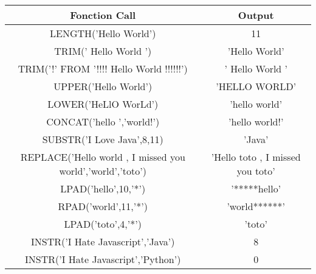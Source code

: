 \vspace{0.25cm}
\begin{center}
    
\renewcommand{\arraystretch}{1.5}
    \begin{tabular}{|c|c|}
        \hline
        Fonction Call & Output\\
        \hline
        LENGTH('Hello World') & 11 \\
        \hline
        TRIM('   Hello  World   ') & 'Hello  World'\\
        \hline
        TRIM('!' FROM '!!!! Hello  World  !!!!!!') & ' Hello  World  ' \\
        \hline
        UPPER('Hello World') &  'HELLO WORLD'\\
        \hline
        LOWER('HeLlO WorLd') & 'hello world'\\
        \hline
        CONCAT('hello ','world!') & 'hello world!'\\
        \hline
        SUBSTR('I Love Java',8,11) & 'Java'\\
        \hline
        REPLACE('Hello world , I missed you world','world','toto') & 'Hello toto , I missed you toto'\\
        \hline
        LPAD('hello',10,'*') & '*****hello'\\
        \hline
        RPAD('world',11,'*') & 'world******' \\
        \hline
        LPAD('toto',4,'*') & 'toto'\\
        \hline
        INSTR('I Hate Javascript','Java') & 8\\
        \hline
        INSTR('I Hate Javascript','Python') & 0\\
        \hline 
   \end{tabular}

\end{center}


